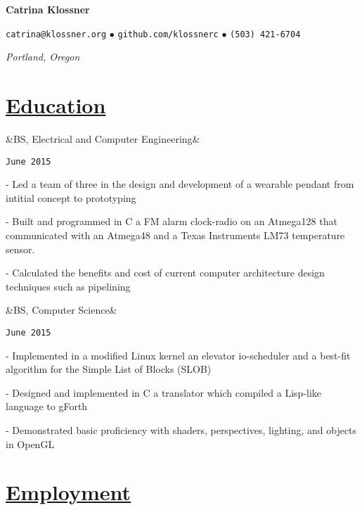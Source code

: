 \documentclass[11pt]{article}
\newcommand{\heading}[1]{
    \section*{\uline{\hfill #1}}
}
\newcommand{\squish}{
    \setlength{\itemsep}{0.5pt}
    \setlength{\parskip}{0pt}
    \setlength{\parsep}{0.5pt}
}
\newcommand{\when}[1]{
    \hfill \texttt{#1}
}
\newcommand{\experience}[3]{
    \ifx&#2&
        \item[{#1}]
    \else
        \item[{#1}, \emph{#2}]
    \fi
    \when{#3}
}
\newcommand{\contact}[4]{
    \centerline{
        \large       
        \texttt{#1}
        $\bullet$
        \texttt{#2}
        $\bullet$
        \texttt{#3}
    }
    \centerline{
        \emph{#4}
    }
}
\newcommand{\skill}[2]{
    \textbf{#1} \hfill #2
}
\newcommand{\CPP}{
    C\hspace{-.05em}\raisebox{.4ex}{\tiny\bf +}\hspace{-.10em}\raisebox{.4ex}{\tiny\bf +}
}
\begin{document}
\centerline{{\Huge \bf Catrina Klossner}}
\bigskip

\contact{catrina@klossner.org}
        {github.com/klossnerc}
        {(503) 421-6704}
        {Portland, Oregon}

%
%
%
%

\heading{Education}%

\begin{description}
\squish   
\experience{Oregon State University}
           {BS, Electrical and Computer Engineering}
           {June 2015}

	- Led a team of three in the design and development of a wearable pendant from intitial concept to prototyping 

	- Built and programmed in C a FM alarm clock-radio on an Atmega128 that communicated with an Atmega48 and a Texas Instruments LM73 temperature sensor.

	- Calculated the benefits and cost of current computer architecture design techniques such as pipelining 

\experience{Oregon State University}
           {BS, Computer Science}
           {June 2015}

	- Implemented in a modified Linux kernel an elevator io-scheduler and a best-fit algorithm for the Simple List of Blocks (SLOB) 

	- Designed and implemented in C a translator which compiled a Lisp-like language to gForth 

	- Demonstrated basic proficiency with shaders, perspectives, lighting, and objects in OpenGL 



\end{description}

\heading{Employment}%
\end{document}
